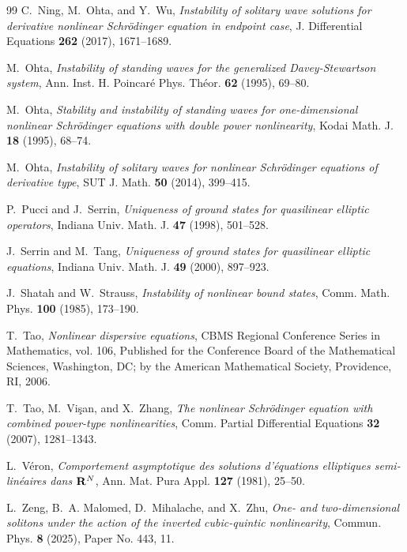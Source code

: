 \documentclass[12pt, a4paper, reqno]{amsart}
\numberwithin{equation}{section}
\theoremstyle{definition}
\theoremstyle{remark}
\begin{document}
\begin{thebibliography}{99}
C.~Ning, M.~Ohta, and Y.~Wu,
\emph{Instability of solitary wave solutions for derivative nonlinear
  {{Schr\"odinger}} equation in endpoint case},
J. Differential Equations \textbf{262} (2017), 1671--1689.

M.~Ohta,
\emph{Instability of standing waves for the generalized {{Davey-Stewartson}}
  system},
Ann. Inst. H. Poincar\'e Phys. Th\'eor. \textbf{62} (1995), 69--80.

M.~Ohta,
\emph{Stability and instability of standing waves for one-dimensional nonlinear
  {{Schr\"odinger}} equations with double power nonlinearity},
Kodai Math. J. \textbf{18} (1995), 68--74.

M.~Ohta,
\emph{Instability of solitary waves for nonlinear {{Schr\"odinger}} equations
  of derivative type},
SUT J. Math. \textbf{50} (2014), 399--415.

P.~Pucci and J.~Serrin,
\emph{Uniqueness of ground states for quasilinear elliptic operators},
Indiana Univ. Math. J. \textbf{47} (1998), 501--528.

J.~Serrin and M.~Tang,
\emph{Uniqueness of ground states for quasilinear elliptic equations},
Indiana Univ. Math. J. \textbf{49} (2000), 897--923.

J.~Shatah and W.~Strauss,
\emph{Instability of nonlinear bound states},
Comm. Math. Phys. \textbf{100} (1985), 173--190.

T.~Tao,
\emph{Nonlinear dispersive equations},
{{CBMS Regional Conference Series}} in {{Mathematics}}, vol. 106, Published for
  the Conference Board of the Mathematical Sciences, Washington, DC; by the
  American Mathematical Society, Providence, RI, 2006.

T.~Tao, M.~Vi{\c s}an, and X.~Zhang,
\emph{The nonlinear {{Schr\"odinger}} equation with combined power-type
  nonlinearities},
Comm. Partial Differential Equations \textbf{32} (2007), 1281--1343.

L.~V{\'e}ron,
\emph{Comportement asymptotique des solutions d'équations elliptiques
  semi-linéaires dans {${\bf R}^{N}$}},
Ann. Mat. Pura Appl. \textbf{127} (1981), 25--50.

L.~Zeng, B.~A. Malomed, D.~Mihalache, and X.~Zhu,
\emph{One- and two-dimensional solitons under the action of the inverted
  cubic-quintic nonlinearity},
Commun. Phys. \textbf{8} (2025), Paper No. 443, 11.

\end{thebibliography}
\end{document}
